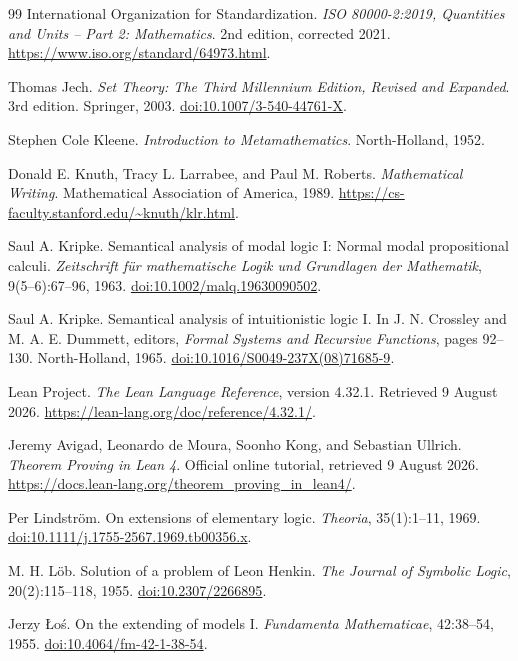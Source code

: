 \documentclass[11pt,oneside,openany]{book}
\theoremstyle{definition}
\theoremstyle{plain}
\theoremstyle{remark}
\begin{document}
\begin{thebibliography}{99}
International Organization for Standardization.
\emph{ISO 80000-2:2019, Quantities and Units -- Part 2: Mathematics}.
2nd edition, corrected 2021.
\url{https://www.iso.org/standard/64973.html}.

Thomas Jech.
\emph{Set Theory: The Third Millennium Edition, Revised and Expanded}.
3rd edition. Springer, 2003.
\href{https://doi.org/10.1007/3-540-44761-X}{doi:10.1007/3-540-44761-X}.

Stephen Cole Kleene.
\emph{Introduction to Metamathematics}.
North-Holland, 1952.

Donald E. Knuth, Tracy L. Larrabee, and Paul M. Roberts.
\emph{Mathematical Writing}.
Mathematical Association of America, 1989.
\url{https://cs-faculty.stanford.edu/~knuth/klr.html}.

Saul A. Kripke.
Semantical analysis of modal logic I: Normal modal propositional calculi.
\emph{Zeitschrift f\"ur mathematische Logik und Grundlagen der Mathematik},
9(5--6):67--96, 1963.
\href{https://doi.org/10.1002/malq.19630090502}{doi:10.1002/malq.19630090502}.

Saul A. Kripke.
Semantical analysis of intuitionistic logic I.
In J. N. Crossley and M. A. E. Dummett, editors,
\emph{Formal Systems and Recursive Functions}, pages 92--130.
North-Holland, 1965.
\href{https://doi.org/10.1016/S0049-237X(08)71685-9}{doi:10.1016/S0049-237X(08)71685-9}.

Lean Project.
\emph{The Lean Language Reference}, version 4.32.1.
Retrieved 9 August 2026.
\url{https://lean-lang.org/doc/reference/4.32.1/}.

Jeremy Avigad, Leonardo de Moura, Soonho Kong, and Sebastian Ullrich.
\emph{Theorem Proving in Lean 4}.
Official online tutorial, retrieved 9 August 2026.
\url{https://docs.lean-lang.org/theorem_proving_in_lean4/}.

Per Lindstr\"om.
On extensions of elementary logic.
\emph{Theoria}, 35(1):1--11, 1969.
\href{https://doi.org/10.1111/j.1755-2567.1969.tb00356.x}{doi:10.1111/j.1755-2567.1969.tb00356.x}.

M. H. L\"ob.
Solution of a problem of Leon Henkin.
\emph{The Journal of Symbolic Logic}, 20(2):115--118, 1955.
\href{https://doi.org/10.2307/2266895}{doi:10.2307/2266895}.

Jerzy \L{}o\'s.
On the extending of models I.
\emph{Fundamenta Mathematicae}, 42:38--54, 1955.
\href{https://doi.org/10.4064/fm-42-1-38-54}{doi:10.4064/fm-42-1-38-54}.


\end{thebibliography}
\end{document}
